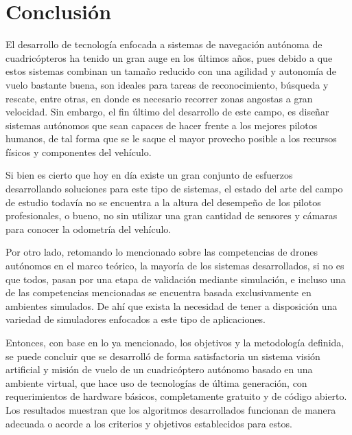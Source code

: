 \chapter{Conclusión}

El desarrollo de tecnología enfocada a sistemas de navegación autónoma de cuadricópteros ha tenido un gran auge en los últimos años, pues debido a que estos sistemas combinan un tamaño reducido con una agilidad y autonomía de vuelo bastante buena, son ideales para tareas de reconocimiento, búsqueda y rescate, entre otras, en donde es necesario recorrer zonas angostas a gran velocidad. Sin embargo, el fin último del desarrollo de este campo, es diseñar sistemas autónomos que sean capaces de hacer frente a los mejores pilotos humanos, de tal forma que se le saque el mayor provecho posible a los recursos físicos y componentes del vehículo.

Si bien es cierto que hoy en día existe un gran conjunto de esfuerzos desarrollando soluciones para este tipo de sistemas, el estado del arte del campo de estudio todavía no se encuentra a la altura del desempeño de los pilotos profesionales, o bueno, no sin utilizar una gran cantidad de sensores y cámaras para conocer la odometría del vehículo.  

Por otro lado, retomando lo mencionado sobre las competencias de drones autónomos en el marco teórico, la mayoría de los sistemas desarrollados, si no es que todos, pasan por una etapa de validación mediante simulación, e incluso una de las competencias mencionadas se encuentra basada exclusivamente en ambientes simulados. De ahí que exista la necesidad de tener a disposición una variedad de simuladores enfocados a este tipo de aplicaciones.

Entonces, con base en lo ya mencionado, los objetivos y la metodología definida, se puede concluir que se desarrolló de forma satisfactoria un sistema visión artificial y misión de vuelo de un cuadricóptero autónomo basado en una ambiente virtual, que hace uso de tecnologías de última generación, con requerimientos de hardware básicos, completamente gratuito y de código abierto. Los resultados muestran que los algoritmos desarrollados funcionan de manera adecuada o acorde a los criterios y objetivos establecidos para estos.

